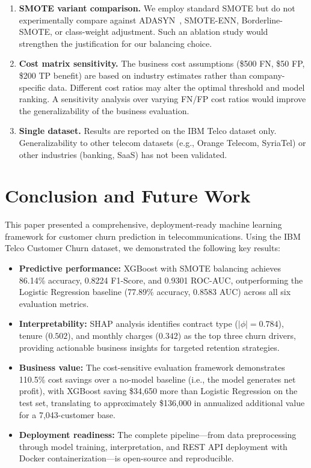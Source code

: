 \documentclass[10pt, conference, letterpaper]{IEEEtran}
\begin{document}
\begin{enumerate}
    \item \textbf{SMOTE variant comparison.} We employ standard SMOTE but do not experimentally compare against ADASYN~\cite{he2008adasyn}, SMOTE-ENN, Borderline-SMOTE, or class-weight adjustment. Such an ablation study would strengthen the justification for our balancing choice.

    \item \textbf{Cost matrix sensitivity.} The business cost assumptions (\$500 FN, \$50 FP, \$200 TP benefit) are based on industry estimates rather than company-specific data. Different cost ratios may alter the optimal threshold and model ranking. A sensitivity analysis over varying FN/FP cost ratios would improve the generalizability of the business evaluation.

    \item \textbf{Single dataset.} Results are reported on the IBM Telco dataset only. Generalizability to other telecom datasets (e.g., Orange Telecom, SyriaTel) or other industries (banking, SaaS) has not been validated.
\end{enumerate}

\section{Conclusion and Future Work}
\label{sec:conclusion}

This paper presented a comprehensive, deployment-ready machine learning framework for customer churn prediction in telecommunications. Using the IBM Telco Customer Churn dataset, we demonstrated the following key results:

\begin{itemize}
    \item \textbf{Predictive performance:} XGBoost with SMOTE balancing achieves 86.14\% accuracy, 0.8224 F1-Score, and 0.9301 ROC-AUC, outperforming the Logistic Regression baseline (77.89\% accuracy, 0.8583 AUC) across all six evaluation metrics.
    \item \textbf{Interpretability:} SHAP analysis identifies contract type ($|\phi|{=}0.784$), tenure ($0.502$), and monthly charges ($0.342$) as the top three churn drivers, providing actionable business insights for targeted retention strategies.
    \item \textbf{Business value:} The cost-sensitive evaluation framework demonstrates 110.5\% cost savings over a no-model baseline (i.e., the model generates net profit), with XGBoost saving \$34,650 more than Logistic Regression on the test set, translating to approximately \$136,000 in annualized additional value for a 7,043-customer base.
    \item \textbf{Deployment readiness:} The complete pipeline---from data preprocessing through model training, interpretation, and REST API deployment with Docker containerization---is open-source and reproducible.
\end{itemize}
\end{document}
